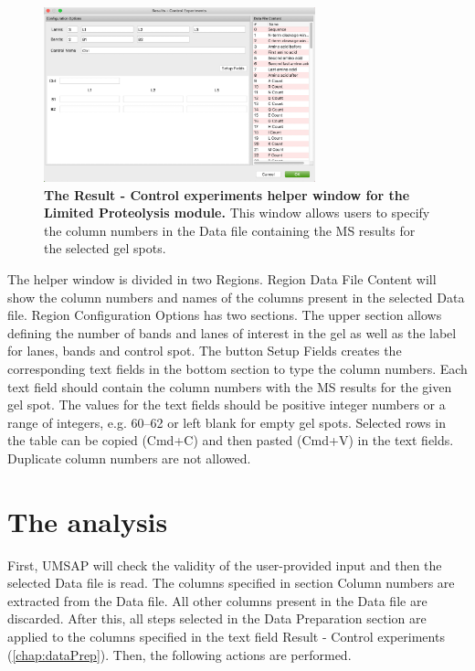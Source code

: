 \begin{figure}[h]
    \centering
    \includegraphics[width=0.7\textwidth]{./IMAGES/MOD-LIMPROT/limprot-rescontrol.jpg}
    \caption[The Result - Control experiments helper window for the Limited Proteolysis module]{\textbf{The Result - Control experiments helper window for the Limited Proteolysis module.} This window allows users to specify the column numbers in the Data file containing the MS results for the selected gel spots.} 
    \label{fig:limprotResControlWindow}
    \vspace{-5pt} 	
\end{figure}

The helper window is divided in two Regions. Region Data File Content will show the 
column numbers and names of the columns present in the selected Data file. Region
Configuration Options has two sections. The upper section allows defining the number
of bands and lanes of interest in the gel as well as the label for lanes, bands and
control spot. The button Setup Fields creates the corresponding text fields in the
bottom section to type the column numbers. Each text field should contain the column
numbers with the MS results for the given gel spot. The values for the text fields
should be positive integer numbers or a range of integers, e.g. 
\numrange[range-phrase=--]{60}{62} or left blank for empty gel spots. Selected rows
in the table can be copied (Cmd+C) and then pasted (Cmd+V) in the text fields. 
Duplicate column numbers are not allowed. 

\section{The analysis}
\label{sec:limprotEquivalenceTest}
First, UMSAP will check the validity of the user-provided input and then the selected
Data file is read. The columns specified in section Column numbers are extracted
from the Data file. All other columns present in the Data file are discarded. After
this, all steps selected in the Data Preparation section are applied to the columns
specified in the text field Result - Control experiments (\autoref{chap:dataPrep}).
Then, the following actions are performed.


